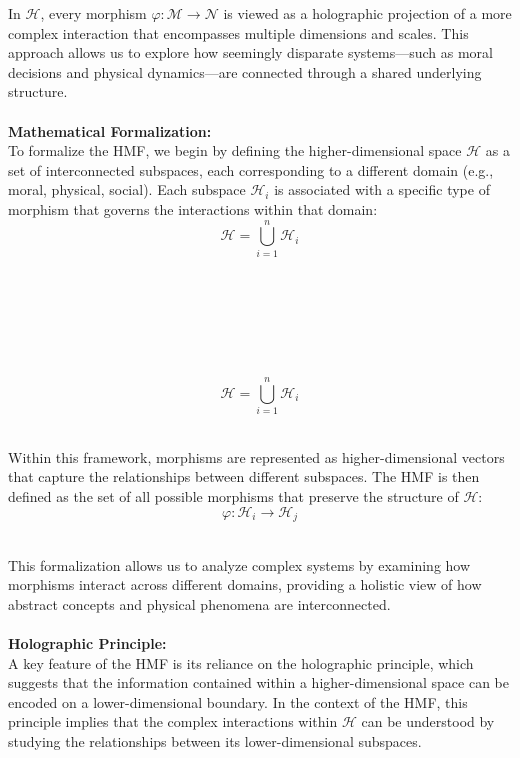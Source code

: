 \documentclass{article}
\begin{document}
In \( \mathcal{H} \), every morphism \( \varphi: \mathcal{M} \to \mathcal{N} \) is viewed as a holographic projection of a more complex interaction that encompasses multiple dimensions and scales. This approach allows us to explore how seemingly disparate systems—such as moral decisions and physical dynamics—are connected through a shared underlying structure.
\\
\\

\textbf{Mathematical Formalization:}
\\

To formalize the HMF, we begin by defining the higher-dimensional space \( \mathcal{H} \) as a set of interconnected subspaces, each corresponding to a different domain (e.g., moral, physical, social). Each subspace \( \mathcal{H}_i \) is associated with a specific type of morphism that governs the interactions within that domain:
\\

\[
\mathcal{H} = \bigcup_{i=1}^{n} \mathcal{H}_i
\]
\\

\

\

\

\[
\mathcal{H} = \bigcup_{i=1}^{n} \mathcal{H}_i
\]
\

Within this framework, morphisms are represented as higher-dimensional vectors that capture the relationships between different subspaces. The HMF is then defined as the set of all possible morphisms that preserve the structure of \( \mathcal{H} \):
\[
\varphi: \mathcal{H}_i \to \mathcal{H}_j
\]
\

This formalization allows us to analyze complex systems by examining how morphisms interact across different domains, providing a holistic view of how abstract concepts and physical phenomena are interconnected.
\\
\\

\textbf{Holographic Principle:}
\\

A key feature of the HMF is its reliance on the holographic principle, which suggests that the information contained within a higher-dimensional space can be encoded on a lower-dimensional boundary. In the context of the HMF, this principle implies that the complex interactions within \( \mathcal{H} \) can be understood by studying the relationships between its lower-dimensional subspaces.
\end{document}
